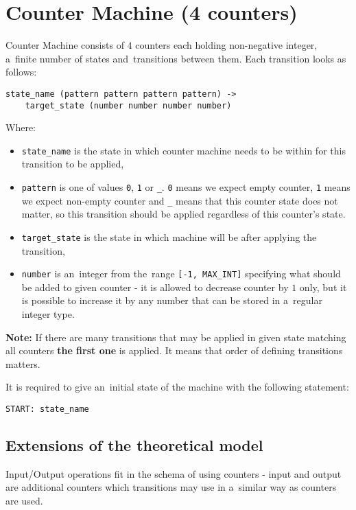 \documentclass[english,shortabstract,mgr]{iithesis}
\begin{document}
\section {Counter Machine (4 counters)}

Counter Machine consists of $4$ counters each holding non-negative integer,
a~finite number of states and~transitions between them. Each transition
looks as follows:

\begin{verbatim}
state_name (pattern pattern pattern pattern) ->
    target_state (number number number number)
\end{verbatim}

Where:
\begin{itemize}
  \item \texttt{state\_name} is the state in which counter machine needs to be
      within for this transition to be applied,
  \item \texttt{pattern} is one of values \texttt{0}, \texttt{1} or \texttt{\_}.
      \texttt{0} means we expect empty counter, \texttt{1} means we expect non-empty
      counter and \texttt{\_} means that this counter state does not matter, so
      this transition should be applied regardless of this counter's state.
  \item \texttt{target\_state} is the state in which machine will be after
      applying the transition,
  \item \texttt{number} is an~integer from the~range \texttt{[-1, MAX\_INT]} specifying
      what should be added to given counter - it is allowed to decrease counter
      by $1$ only, but it is possible to increase it by any number that can be stored
      in a~regular integer type.
\end{itemize}

\textbf{Note:} If there are many transitions that may be applied in given state
matching all counters \textbf{the first one} is applied. It means that order
of defining transitions matters.

It is required to give an~initial state of the machine with the following statement:
\begin{verbatim}
START: state_name
\end{verbatim}

\subsection {Extensions of the theoretical model}

Input/Output operations fit in the schema of using counters - input and output
are additional counters which transitions may use in a~similar way as counters are used.
\end{document}
